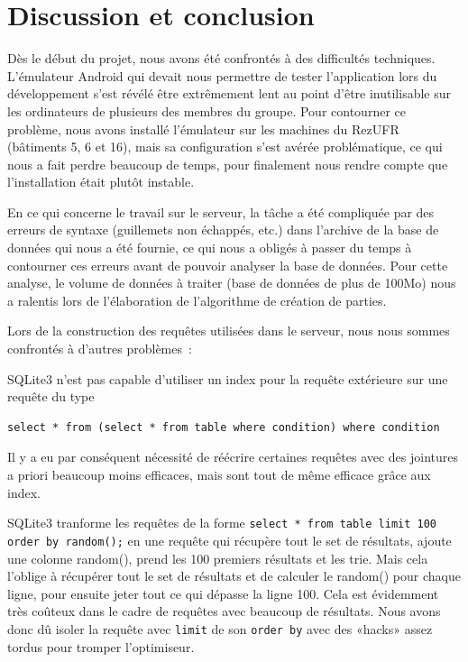 \documentclass[a4paper,11pt,french]{article}
\def\android{Android\texttrademark{}}
\begin{document}
\section{Discussion et conclusion}

Dès le début du projet, nous avons été confrontés à des difficultés techniques. L'émulateur \android{} qui devait nous permettre de tester
l'application lors du développement s'est révélé être extrêmement lent au point d'être inutilisable sur les ordinateurs de plusieurs des membres
du groupe. Pour contourner ce problème, nous avons installé l'émulateur sur les machines du RezUFR (bâtiments 5, 6 et 16), mais sa
configuration s'est avérée problématique, ce qui nous a fait perdre beaucoup de temps, pour finalement nous rendre compte que l'installation était plutôt instable.

En ce qui concerne le travail sur le serveur, la tâche a été compliquée par des erreurs de syntaxe (guillemets non échappés, etc.) dans
l'archive de la base de données qui nous a été fournie, ce qui nous a obligés à passer du temps à contourner ces erreurs avant de pouvoir
analyser la base de données. Pour cette analyse, le volume de données à traiter (base de données de plus de 100Mo) nous a ralentis lors de
l'élaboration de l'algorithme de création de parties.

Lors de la construction des requêtes utilisées dans le serveur, nous nous sommes confrontés à d'autres problèmes~:

SQLite3 n'est pas capable d'utiliser un index pour la requête extérieure sur une requête du type
\begin{verbatim}
select * from (select * from table where condition) where condition
\end{verbatim}
Il y a eu par conséquent nécessité de réécrire certaines requêtes avec des jointures a priori beaucoup moins efficaces, mais sont tout de même efficace grâce aux index.

SQLite3 tranforme les requêtes de la forme \verb!select * from table limit 100 order by random();! en une requête qui récupère tout le set
de résultats, ajoute une colonne random(), prend les 100 premiers résultats et les trie. Mais cela l'oblige à récupérer tout le set de
résultats et de calculer le random() pour chaque ligne, pour ensuite jeter tout ce qui dépasse la ligne 100. Cela est évidemment très coûteux
dans le cadre de requêtes avec beaucoup de résultats. Nous avons donc dû isoler la requête avec \verb!limit! de son \verb!order by! avec
des «hacks» assez tordus pour tromper l'optimiseur.
\end{document}

